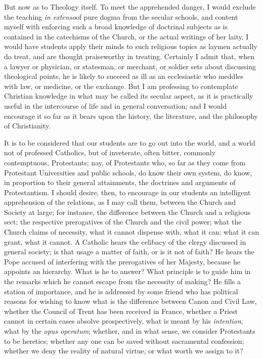 But now as to Theology itself. To meet the apprehended danger, I
would exclude the teaching \emph{in extenso}of pure dogma from
the secular schools, and content myself with enforcing such a broad
knowledge of doctrinal subjects as is contained in the catechisms of
the Church, or the actual writings of her laity. I would have students
apply their minds to such religious topics as laymen actually do
treat, and are thought praiseworthy in treating. Certainly I admit
that, when a lawyer or physician, or statesman, or merchant, or
soldier sets about discussing theological points, he is likely to
succeed as ill as an ecclesiastic who meddles with law, or medicine,
or the exchange. But I am professing to contemplate Christian
knowledge in what may be called its secular aspect, as it is
practically useful in the intercourse of life and in general
conversation; and I would encourage it so far as it bears upon the
history, the literature, and the philosophy of Christianity.

It is to be considered that our students are to go out into the
world, and a world not of professed Catholics, but of inveterate,
often bitter, commonly contemptuous, Protestants; nay, of Protestants
who, so far as they come from Protestant Universities and public
schools, do know their own system, do know, in proportion to their
general attainments, the doctrines and arguments of Protestantism. I
should desire, then, to encourage in our students an intelligent
apprehension of the relations, as I may call them, between the Church
and Society at large; for instance, the difference between the Church
and a religious sect; the respective prerogatives of the Church and
the civil power; what the Church claims of necessity, what it cannot
dispense with, what it can; what it can grant, what it cannot. A
Catholic hears the celibacy of the clergy discussed in general
society; is that usage a matter of faith, or is it not of faith? He
hears the Pope accused of interfering with the prerogatives of
her Majesty, because he appoints an hierarchy. What is he to answer?
What principle is to guide him in the remarks which he cannot escape
from the necessity of making? He fills a station of importance, and he
is addressed by some friend who has political reasons for wishing to
know what is the difference between Canon and Civil Law, whether the
Council of Trent has been received in France, whether a Priest cannot
in certain cases absolve prospectively, what is meant by his \emph{intention},
what by the \emph{opus operatum}; whether, and in what sense, we
consider Protestants to be heretics; whether any one can be saved
without sacramental confession; whether we deny the reality of natural
virtue, or what worth we assign to it?

